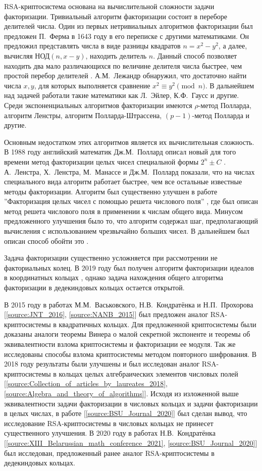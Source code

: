 \documentclass[_00_dissertation.tex]{subfiles}
\begin{document}
RSA-криптосистема основана на вычислительной сложности задачи факторизации.
Тривиальный алгоритм факторизации состоит в переборе делителей числа.
Один из первых нетривиальных алгоритмов факторизации был предложен П.~Ферма в 1643 году в его переписке с другими математиками.
Он предложил представлять числа в виде разницы квадратов $n = x^2 - y^2$, а далее, вычисляя $\textrm{НОД}(n,x-y)$, находить делитель $n$.
Данный способ позволяет находить два мало различающихся по величине делителя числа быстрее, чем простой перебор делителей \cite{source:Yaschenko}.
А.М.~Лежандр обнаружил, что достаточно найти числа $x, y$, для которых выполняется сравнение $x^{2}\equiv y^{2}\pmod{n}$.
В дальнейшем над задачей работали такие математики как Л.~Эйлер, К.Ф.~Гаусс и другие.
Среди экспоненциальных алгоритмов факторизации имеются $\rho$-метод Полларда, алгоритм Ленстры, алгоритм Полларда-Штрассена, $(p-1)$-метод Полларда и другие.

Основным недостатком этих алгоритмов является их вычислительная сложность.
В 1988 году английский математик Дж.М.~Поллард описал новый для того времени метод факторизации целых чисел специальной формы $2^n \pm C$ \cite{source:Pollard}.
А.~Ленстра, Х.~Ленстра, М.~Манассе и Дж.М.~Поллард показали, что на числах специального вида алгоритм работает быстрее, чем все остальные известные методы факторизации.
Алгоритм был существенно улучшен в работе ''Факторизация целых чисел с помощью решета числового поля'' \cite{source:Buhler}, где был описан метод решета числового поля в применении к числам общего вида.
Минусом предложенного улучшения было то, что алгоритм содержал шаг, предполагающий вычисления с использованием чрезвычайно больших чисел.
В дальнейшем был описан способ обойти это \cite{source:Couveignes}.

Задача факторизации существенно усложняется при рассмотрении не факториальных колец.
В 2019 году был получен алгоритм факторизации идеалов в координатных кольцах \cite{source:Darkey-Mensah}, однако задача нахождения общего алгоритма факторизации в дедекиндовых кольцах остается открытой.

В 2015 году в работах М.М.~Васьковского, Н.В.~Кондратёнка и Н.П.~Прохорова [\ref{source:JNT_2016}, \ref{source:NANB_2015}] был предложен аналог RSA-криптосистемы в квадратичных кольцах.
Для предложенной криптосистемы были доказаны аналоги теоремы Винера о малой секретной экспоненте и теоремы об эквивалентности взлома криптосистемы и факторизации ее модуля.
Так же исследованы способы взлома криптосистемы методом повторного шифрования.
В 2018 году результаты были улучшены и был исследован аналог RSA-криптосистемы в кольцах целых алгебраических элементов числовых полей [\ref{source:Collection_of_articles_by_laureates_2018}, \ref{source:Algebra_and_theory_of_algorithms}].
Исходя из изложенной выше эквивалентности задачи факторизации в числовых кольцах и задачи факторизации в целых числах, в работе [\ref{source:BSU_Journal_2020}] был сделан вывод, что исследование RSA-криптосистемы в числовых кольцах не принесет существенного улучшения.
В 2020 году в работах Н.В.~Кондратёнка [\ref{source:XIII_Belarussian_math_conference_2021}, \ref{source:BSU_Journal_2020}] был исследован, предложенный ранее аналог RSA-криптосистемы в дедекиндовых кольцах.
\end{document}
